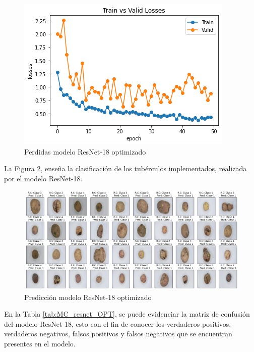 	\newpage
		\begin{figure}[ht]
			\centering
			\includegraphics[scale=0.6]{Figs/513.png}
			\caption{Perdidas modelo ResNet-18 optimizado}
			\label{fig:perdda_REs_opt}
		\end{figure}
	La Figura \ref{fig:pre_res_opt}, enseña la clasificación de los tubérculos implementados, realizada por el modelo ResNet-18.
		\begin{figure}[ht]
			\centering
			\includegraphics[scale=0.4]{Figs/514.png}
			\caption{Predicción modelo ResNet-18 optimizado}
			\label{fig:pre_res_opt}
		\end{figure}
	
	En la Tabla \ref{tab:MC_resnet_OPT}, se puede evidenciar la matriz de confusión del modelo ResNet-18, esto con el fin de conocer los verdaderos positivos, verdaderos negativos, falsos positivos y falsos negativos que se encuentran presentes en el modelo.
	
